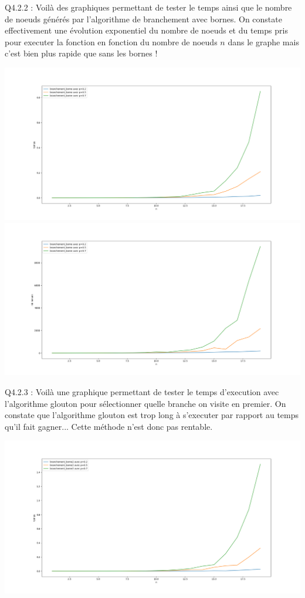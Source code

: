 \documentclass[a4paper]{article}
\begin{document}
Q4.2.2 : 
Voilà des graphiques permettant de tester le temps ainsi que le nombre de noeuds générés par l'algorithme de branchement avec bornes. On constate effectivement une évolution exponentiel du nombre de noeuds et du temps pris pour executer la fonction en fonction du nombre de noeuds $n$ dans le graphe mais c'est bien plus rapide que sans les bornes !

\includegraphics[scale=0.3]{"./test_branchement_borne.png"}
\includegraphics[scale=0.3]{"./test_nb_noeuds_branchement_borne.png"}

Q4.2.3 : 
Voilà une graphique permettant de tester le temps d'execution avec l'algorithme glouton pour sélectionner quelle branche on visite en premier. On constate que l'algorithme glouton est trop long à s'executer par rapport au temps qu'il fait gagner... Cette méthode n'est donc pas rentable.

\includegraphics[scale=0.3]{"./test_branchement_borne2.png"}
\end{document}

